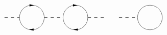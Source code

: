 \begin{equation}
\begin{aligned}
\begin{gathered}
\begin{tikzpicture}[x=0.75pt,y=0.75pt,yscale=-0.7,xscale=0.7]
                \draw  [dash pattern={on 4.5pt off 4.5pt}]  (100.71,140) -- (140.71,140) ;
                \draw   (140.71,140) .. controls (140.71,121.77) and (155.48,107) .. (173.71,107) .. controls (191.93,107) and (206.71,121.77) .. (206.71,140) .. controls (206.71,158.23) and (191.93,173) .. (173.71,173) .. controls (155.48,173) and (140.71,158.23) .. (140.71,140) -- cycle ;
                \draw    (179.5,107.25) ;
                \draw [shift={(179.5,107.25)}, rotate = 180] [fill={rgb, 255:red, 0; green, 0; blue, 0 }  ][line width=0.08]  [draw opacity=0] (12,-3) -- (0,0) -- (12,3) -- cycle    ;
                \draw    (172.33,172.5) -- (168.33,172.5) ;
                \draw [shift={(166.33,172.5)}, rotate = 360] [fill={rgb, 255:red, 0; green, 0; blue, 0 }  ][line width=0.08]  [draw opacity=0] (12,-3) -- (0,0) -- (12,3) -- cycle    ;
                \draw  [dash pattern={on 4.5pt off 4.5pt}]  (206.71,140) -- (257,140) ;
                \draw   (257,140) .. controls (257,121.77) and (271.77,107) .. (290,107) .. controls (308.23,107) and (323,121.77) .. (323,140) .. controls (323,158.23) and (308.23,173) .. (290,173) .. controls (271.77,173) and (257,158.23) .. (257,140) -- cycle ;
                \draw    (295.5,107.25) ;
                \draw [shift={(295.5,107.25)}, rotate = 180] [fill={rgb, 255:red, 0; green, 0; blue, 0 }  ][line width=0.08]  [draw opacity=0] (12,-3) -- (0,0) -- (12,3) -- cycle    ;
                \draw    (290.33,172.5) -- (286.33,172.5) ;
                \draw [shift={(284.33,172.5)}, rotate = 360] [fill={rgb, 255:red, 0; green, 0; blue, 0 }  ][line width=0.08]  [draw opacity=0] (12,-3) -- (0,0) -- (12,3) -- cycle    ;
                \draw  [dash pattern={on 4.5pt off 4.5pt}]  (323,140) -- (373.29,140) ;
                \draw  [dash pattern={on 4.5pt off 4.5pt}]  (406.29,140) -- (456.59,140) ;
                \draw   (456,140) .. controls (456,121.77) and (470.77,107) .. (489,107) .. controls (507.23,107) and (522,121.77) .. (522,140) .. controls (522,158.23) and (507.23,173) .. (489,173) .. controls (470.77,173) and (456,158.23) .. (456,140) -- cycle ;

\end{tikzpicture}
\end{gathered}
\end{aligned}
\end{equation}
